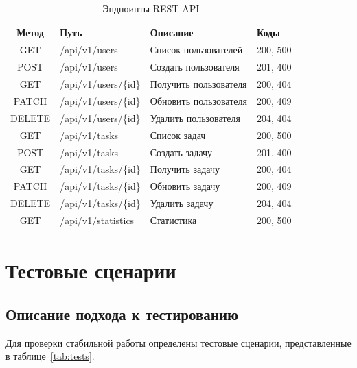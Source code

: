 \documentclass[a4paper,14pt]{extarticle}
\begin{document}
\begin{table}[H]
\caption{Эндпоинты REST API}\label{tab:endpoints}
\centering
\small
\begin{tabularx}{\textwidth}{|c|l|X|l|}
\hline
\textbf{Метод} & \textbf{Путь} & \textbf{Описание} & \textbf{Коды} \\
\hline
GET & /api/v1/users & Список пользователей & 200, 500 \\
\hline
POST & /api/v1/users & Создать пользователя & 201, 400 \\
\hline
GET & /api/v1/users/\{id\} & Получить пользователя & 200, 404 \\
\hline
PATCH & /api/v1/users/\{id\} & Обновить пользователя & 200, 409 \\
\hline
DELETE & /api/v1/users/\{id\} & Удалить пользователя & 204, 404 \\
\hline
GET & /api/v1/tasks & Список задач & 200, 500 \\
\hline
POST & /api/v1/tasks & Создать задачу & 201, 400 \\
\hline
GET & /api/v1/tasks/\{id\} & Получить задачу & 200, 404 \\
\hline
PATCH & /api/v1/tasks/\{id\} & Обновить задачу & 200, 409 \\
\hline
DELETE & /api/v1/tasks/\{id\} & Удалить задачу & 204, 404 \\
\hline
GET & /api/v1/statistics & Статистика & 200, 500 \\
\hline
\end{tabularx}
\end{table}

\clearpage
\section{Тестовые сценарии}

\subsection{Описание подхода к тестированию}

Для проверки стабильной работы определены тестовые сценарии, представленные в таблице~\ref{tab:tests}.
\end{document}
